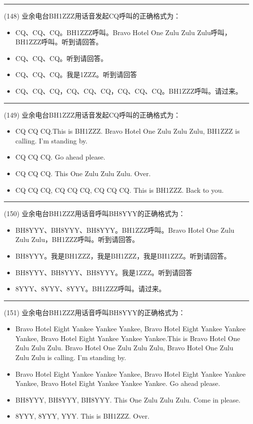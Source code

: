 \documentclass[twocolumn,hyperref,UTF8]{ctexart}  %
\begin{document}
\noindent\rule{0.5\textwidth}{1pt}
\heiti (148) 业余电台BH1ZZZ用话音发起CQ呼叫的正确格式为： \songti {\color{gray} [LK0238] }
\begin{itemize}
	\item  CQ、CQ、CQ。BH1ZZZ呼叫。Bravo Hotel One Zulu Zulu Zulu呼叫，BH1ZZZ呼叫。听到请回答。
	\item  CQ、CQ、CQ。听到请回答。
	\item  CQ、CQ、CQ。我是1ZZZ。听到请回答
	\item  CQ、CQ、CQ，CQ、CQ、CQ，CQ、CQ、CQ。BH1ZZZ呼叫。请过来。
\end{itemize}


\noindent\rule{0.5\textwidth}{1pt}
\heiti (149) 业余电台BH1ZZZ用话音发起CQ呼叫的正确格式为： \songti {\color{gray} [LK0239] }
\begin{itemize}
	\item  CQ CQ CQ.This is BH1ZZZ. Bravo Hotel One Zulu Zulu Zulu, BH1ZZZ is calling. I’m standing by.
	\item  CQ CQ CQ. Go ahead please.
	\item  CQ CQ CQ. This One Zulu Zulu Zulu. Over.
	\item  CQ CQ CQ, CQ CQ CQ, CQ CQ CQ. This is BH1ZZZ. Back to you.
\end{itemize}


\noindent\rule{0.5\textwidth}{1pt}
\heiti (150) 业余电台BH1ZZZ用话音呼叫BH8YYY的正确格式为： \songti {\color{gray} [LK0241] }
\begin{itemize}
	\item  BH8YYY、BH8YYY、BH8YYY。BH1ZZZ呼叫。Bravo Hotel One Zulu Zulu Zulu，BH1ZZZ呼叫。听到请回答。
	\item  BH8YYY。我是BH1ZZZ，我是BH1ZZZ，我是BH1ZZZ。听到请回答。
	\item  BH8YYY、BH8YYY、BH8YYY。我是1ZZZ。听到请回答
	\item  8YYY、8YYY、8YYY。BH1ZZZ呼叫。请过来。
\end{itemize}


\noindent\rule{0.5\textwidth}{1pt}
\heiti (151) 业余电台BH1ZZZ用话音呼叫BH8YYY的正确格式为： \songti {\color{gray} [LK0242] }
\begin{itemize}
	\item  Bravo Hotel Eight Yankee Yankee Yankee, Bravo Hotel Eight Yankee Yankee Yankee, Bravo Hotel Eight Yankee Yankee Yankee.This is Bravo Hotel One Zulu Zulu Zulu. Bravo Hotel One Zulu Zulu Zulu, Bravo Hotel One Zulu Zulu Zulu is calling. I’m standing by.
	\item  Bravo Hotel Eight Yankee Yankee Yankee, Bravo Hotel Eight Yankee Yankee Yankee, Bravo Hotel Eight Yankee Yankee Yankee. Go ahead please.
	\item  BH8YYY, BH8YYY, BH8YYY. This One Zulu Zulu Zulu. Come in please.
	\item  8YYY, 8YYY, YYY. This is BH1ZZZ. Over.
\end{itemize}
\end{document}
